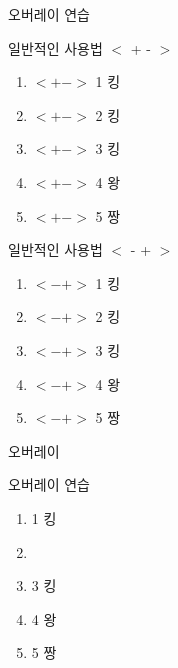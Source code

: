 \documentclass[9pt,blue,xcolor=pdftex,dvipsnames,table,handout,notes]{beamer}
\begin{document}
		\begin{frame}[t]{오버레이 연습 }

			\begin{block} {일반적인 사용법 $<$ + - $>$}
			\begin{enumerate}
			\item <+-> $<+->$ 1 킹
			\item <+-> $<+->$ 2 킹
			\item <+-> $<+->$ 3 킹
			\item <+-> $<+->$ 4 왕
			\item <+-> $<+->$ 5 짱
			\end{enumerate}
			\end{block}


			\begin{block} {일반적인 사용법 $<$ - + $>$}
			\begin{enumerate}
			\item <-+> $<-+>$ 1 킹
			\item <-+> $<-+>$ 2 킹
			\item <-+> $<-+>$ 3 킹
			\item <-+> $<-+>$ 4 왕
			\item <-+> $<-+>$ 5 짱
			\end{enumerate}
			\end{block}

		\end{frame}




		\begin{frame}[t]{오버레이}

			\begin{block} {오버레이 연습}
			\begin{enumerate}
			\item <1-6> 1 킹
			\item <2-6> 
			\item <3-6> 3 킹
			\item <4-6> 4 왕
			\item <5-6> 5 짱
			
			\end{enumerate}
			\end{block}

		\end{frame}




\end{document}
